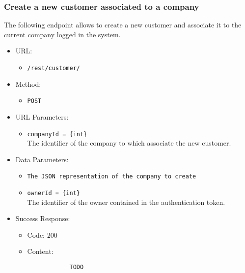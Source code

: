 \subsubsection*{Create a new customer associated to a company}

The following endpoint allows to create a new customer and associate it to the current company logged in the system.

\begin{itemize}
    
    \item URL: 
    \begin{itemize}
        \item \texttt{/rest/customer/}
    \end{itemize}
    
    \item Method: 
    \begin{itemize}
        \item \texttt{POST}
    \end{itemize}
    
    \item URL Parameters: 
    \begin{itemize}
        \item \texttt{companyId = \{int\}} \\
        The identifier of the company to which associate the new customer.
    \end{itemize}
    
    \item Data Parameters: 
    \begin{itemize}
        \item \texttt{The JSON representation of the company to create} 
        \item \texttt{ownerId = \{int\}} \\
        The identifier of the owner contained in the authentication token.
    \end{itemize}
    
    \item Success Response: 
    \begin{itemize}
        \item Code: 200
        \item Content:
        \begin{lstlisting}
            TODO
        \end{lstlisting}    
    \end{itemize}
    

\end{itemize}
